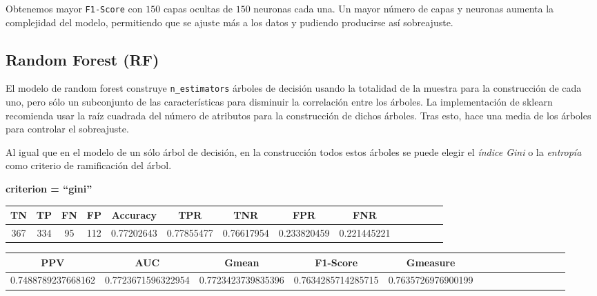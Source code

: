 \documentclass[a4]{article}
\begin{document}
\vspace{5mm}

Obtenemos mayor \texttt{F1-Score} con $150$ capas ocultas de $150$ neuronas cada una. Un mayor número de capas y neuronas aumenta la complejidad del modelo, permitiendo que se ajuste más a los datos y pudiendo producirse así sobreajuste.

\subsection{Random Forest (RF)}

El modelo de random forest construye \texttt{n\_estimators} árboles de decisión usando la totalidad de la muestra para la construcción de cada uno, pero sólo un subconjunto de las características para disminuir la correlación entre los árboles. La implementación de sklearn recomienda usar la raíz cuadrada del número de atributos para la construcción de dichos árboles. Tras esto, hace una media de los árboles para controlar el sobreajuste.

Al igual que en el modelo de un sólo árbol de decisión, en la construcción todos estos árboles se puede elegir el \textit{índice Gini} o la \textit{entropía} como criterio de ramificación del árbol.

\textbf{criterion = ``gini''}
\begin{center}
\begin{tabular}{|c|c|c|c|c|c|c|c|c|c|c|c|c|c|}
\hline
\multicolumn{1}{|c|}{\textbf{TN}}& \textbf{TP} & \textbf{FN} & \textbf{FP} & \textbf{Accuracy} & \textbf{TPR} & \textbf{TNR} & \textbf{FPR} &\textbf{FNR} \\ \hline
  367 & 334 & 95 & 112 & 0.77202643 & 0.77855477 & 0.76617954 & 0.233820459 & 0.221445221 \\ \hline
\end{tabular}
\end{center}

\begin{center}
\begin{tabular}{|c|c|c|c|c|c|c|c|c|c|c|c|c|c|}
\hline
\multicolumn{1}{|c|}{\textbf{PPV}} & \textbf{AUC} & \textbf{Gmean} & \textbf{F1-Score} & \textbf{Gmeasure}  \\ \hline
  0.7488789237668162 & 0.7723671596322954 & 0.7723423739835396 & 0.7634285714285715 & 0.7635726976900199 \\ \hline
\end{tabular}
\end{center}
\end{document}
